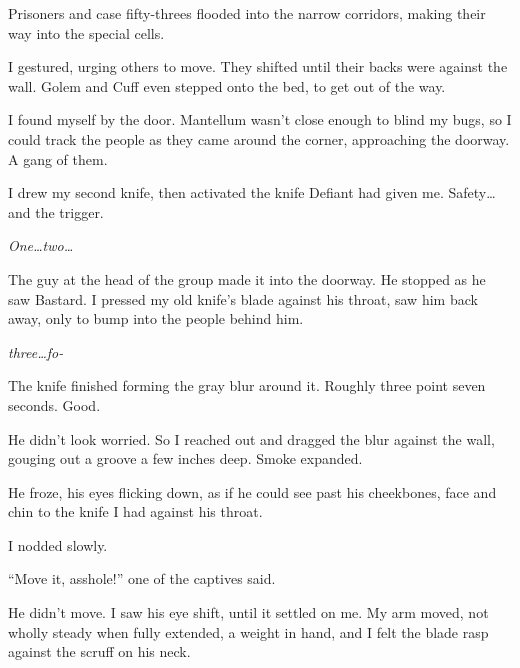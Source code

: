 





Prisoners and case fifty-threes flooded into the narrow corridors, making their way into the special cells.



I gestured, urging others to move.  They shifted until their backs were against the wall.  Golem and Cuff even stepped onto the bed, to get out of the way.



I found myself by the door.  Mantellum wasn't close enough to blind my bugs, so I could track the people as they came around the corner, approaching the doorway.  A gang of them.



I drew my second knife, then activated the knife Defiant had given me.  Safety\ldots and the trigger.



\emph{One\ldots two\ldots}



The guy at the head of the group made it into the doorway.  He stopped as he saw Bastard.  I pressed my old knife's blade against his throat, saw him back away, only to bump into the people behind him.



\emph{three\ldots fo-}



The knife finished forming the gray blur around it.  Roughly three point seven seconds.  Good.



He didn't look worried.  So I reached out and dragged the blur against the wall, gouging out a groove a few inches deep.  Smoke expanded.



He froze, his eyes flicking down, as if he could see past his cheekbones, face and chin to the knife I had against his throat.



I nodded slowly.



``Move it, asshole!''  one of the captives said.



He didn't move.  I saw his eye shift, until it settled on me.  My arm moved, not wholly steady when fully extended, a weight in hand, and I felt the blade rasp against the scruff on his neck.



